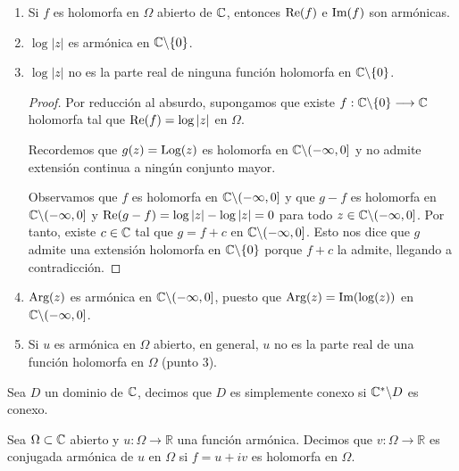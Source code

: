 \begin{ejemplo}
    \begin{enumerate}
        \item Si $f$ es holomorfa en $\Omega$ abierto de $\mathbb{C}$, entonces $\text{Re}(f)$ e $\text{Im}(f)$ son armónicas.
        \item $\log|z|$ es armónica en $\mathbb{C} \backslash \{0\}$.
        \item $\log|z|$ no es la parte real de ninguna función holomorfa en $\mathbb{C} \backslash \{0\}$.
              \begin{proof}
                  Por reducción al absurdo, supongamos que existe $f : \mathbb{C} \backslash \{0\} \longrightarrow \mathbb{C}$ holomorfa tal que $\text{Re}(f) = \log|z|$ en $\Omega$.

                  Recordemos que $g(z) = \text{Log}(z)$ es holomorfa en $\mathbb{C} \backslash (-\infty,0]$ y no admite extensión continua a ningún conjunto mayor.

                  Observamos que $f$ es holomorfa en $\mathbb{C} \backslash (-\infty,0]$ y que $g - f$ es holomorfa en $\mathbb{C} \backslash (-\infty,0]$ y $\text{Re}(g-f) = \log|z| - \log|z| = 0$ para todo $z \in \mathbb{C} \backslash (-\infty,0]$. Por tanto, existe $c \in \mathbb{C}$ tal que $g = f + c$ en $\mathbb{C} \backslash (-\infty,0]$. Esto nos dice que $g$ admite una extensión holomorfa en $\mathbb{C} \backslash \{0\}$ porque $f+c$ la admite, llegando a contradicción.
              \end{proof}
        \item $\text{Arg}(z)$ es armónica en $\mathbb{C} \backslash (-\infty,0]$, puesto que $\text{Arg}(z) = \text{Im} (\log(z))$ en $\mathbb{C} \backslash (-\infty,0]$.
        \item Si $u$ es armónica en $\Omega$ abierto, en general, $u$ no es la parte real de una función holomorfa en $\Omega$ (punto 3).
    \end{enumerate}
\end{ejemplo}

\begin{defi}
    Sea $D$ un dominio de $\mathbb{C}$, decimos que $D$ es simplemente conexo si $\mathbb{C}^* \backslash D$ es conexo.
\end{defi}

\begin{defi}
    Sea $\Omega \subset \mathbb{C}$ abierto y $u : \Omega \longrightarrow \mathbb{R}$ una función armónica. Decimos que $v : \Omega \longrightarrow \mathbb{R}$ es conjugada armónica de $u$ en $\Omega$ si $f = u + iv$ es holomorfa en $\Omega$.
\end{defi}


